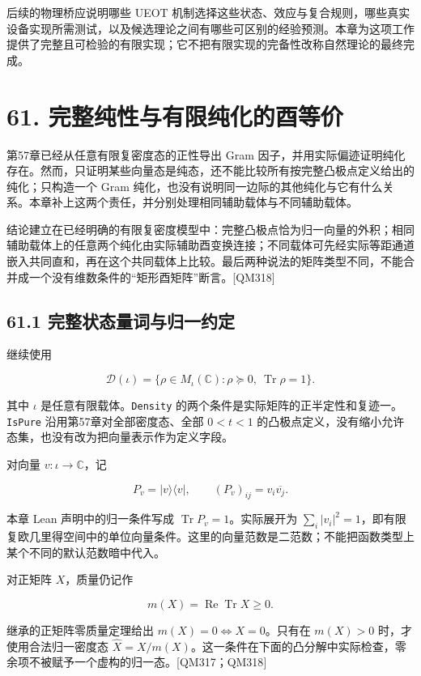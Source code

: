 \documentclass[
  11pt,
  oneside]{book}
\begin{document}
后续的物理桥应说明哪些 UEOT
机制选择这些状态、效应与复合规则，哪些真实设备实现所需测试，以及候选理论之间有哪些可区别的经验预测。本章为这项工作提供了完整且可检验的有限实现；它不把有限实现的完备性改称自然理论的最终完成。

\hypertarget{ch-61}{%
\chapter{61. 完整纯性与有限纯化的酉等价}\label{ch-61}}

第57章已经从任意有限复密度态的正性导出 Gram
因子，并用实际偏迹证明纯化存在。然而，只证明某些向量态是纯态，还不能比较所有按完整凸极点定义给出的纯化；只构造一个
Gram
纯化，也没有说明同一边际的其他纯化与它有什么关系。本章补上这两个责任，并分别处理相同辅助载体与不同辅助载体。

结论建立在已经明确的有限复密度模型中：完整凸极点恰为归一向量的外积；相同辅助载体上的任意两个纯化由实际辅助酉变换连接；不同载体可先经实际等距通道嵌入共同直和，再在这个共同载体上比较。最后两种说法的矩阵类型不同，不能合并成一个没有维数条件的``矩形酉矩阵''断言。{[}QM318{]}

\hypertarget{ux5b8cux6574ux72b6ux6001ux91cfux8bcdux4e0eux5f52ux4e00ux7ea6ux5b9a}{%
\section{61.1
完整状态量词与归一约定}\label{ux5b8cux6574ux72b6ux6001ux91cfux8bcdux4e0eux5f52ux4e00ux7ea6ux5b9a}}

继续使用

\[
\mathcal D(\iota)=\{\rho\in M_\iota(\mathbb C):\rho\succeq0,\ \operatorname{Tr}\rho=1\}.
\]

其中 \(\iota\) 是任意有限载体。\texttt{Density}
的两个条件是实际矩阵的正半定性和复迹一。\texttt{IsPure}
沿用第57章对全部密度态、全部 \(0<t<1\)
的凸极点定义，没有缩小允许态集，也没有改为把向量表示作为定义字段。

对向量 \(v:\iota\to\mathbb C\)，记

\[
P_v=|v\rangle\langle v|,
\qquad (P_v)_{ij}=v_i\overline{v_j}.
\]

本章 Lean 声明中的归一条件写成 \(\operatorname{Tr}P_v=1\)。实际展开为
\(\sum_i|v_i|^2=1\)，即有限复欧几里得空间中的单位向量条件。这里的向量范数是二范数；不能把函数类型上某个不同的默认范数暗中代入。

对正矩阵 \(X\)，质量仍记作

\[
m(X)=\operatorname{Re}\operatorname{Tr}X\ge0.
\]

继承的正矩阵零质量定理给出 \(m(X)=0\iff X=0\)。只有在 \(m(X)>0\)
时，才使用合法归一密度态
\(\widehat X=X/m(X)\)。这一条件在下面的凸分解中实际检查，零余项不被赋予一个虚构的归一态。{[}QM317；QM318{]}
\end{document}
